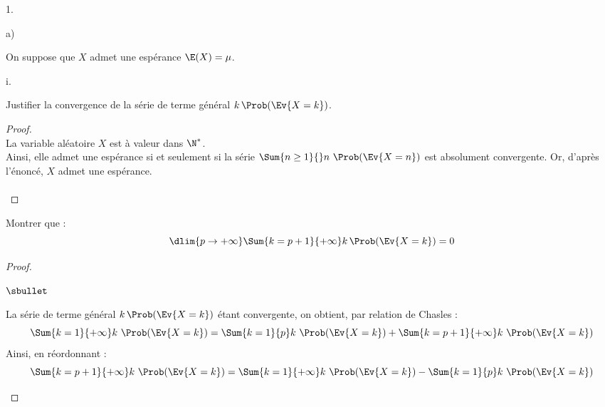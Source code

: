 \documentclass[11pt]{article}%
\begin{document}
\begin{noliste}{1.}
\newpage


\item 
  \begin{noliste}{a)}
  \item On suppose que $X$ admet une espérance $\E(X)= \mu$.
    \begin{nonoliste}{i.}
    \item Justifier la convergence de la série de terme général $k \,
      \Prob(\Ev{X=k})$.
      
      \begin{proof}~\\
        La variable aléatoire $X$ est à valeur dans $\N^*$.\\
        Ainsi, elle admet une espérance si et seulement si la série
        $\Sum{n \geq 1}{} n \ \Prob(\Ev{X = n})$ est absolument
        convergente. Or, d'après l'énoncé, $X$ admet une espérance. \\[-.8cm]%
        ~\\[-.5cm]
      \end{proof}

    \item Montrer que : 
      \[
      \dlim{p \to +\infty} \Sum{k=p+1}{+\infty} k \, \Prob(\Ev{X=k})=0
      \]
      
      \begin{proof}~%
        \begin{noliste}{$\sbullet$}
        \item La série de terme général $k \, \Prob(\Ev{X=k})$ étant
          convergente, on obtient, par relation de Chasles :
          \[
          \Sum{k = 1}{+\infty} k \ \Prob(\Ev{X = k}) = \Sum{k = 1}{p}
          k \ \Prob(\Ev{X = k}) + \Sum{k = p+1}{+\infty} k \
          \Prob(\Ev{X = k})
          \]
          Ainsi, en réordonnant :
          \[
          \Sum{k = p+1}{+\infty} k \ \Prob(\Ev{X = k}) = \Sum{k =
            1}{+\infty} k \ \Prob(\Ev{X = k}) - \Sum{k = 1}{p} k \
          \Prob(\Ev{X = k})
          \]


\end{noliste}
\end{proof}
\end{nonoliste}
\end{noliste}
\end{noliste}
\end{document}

